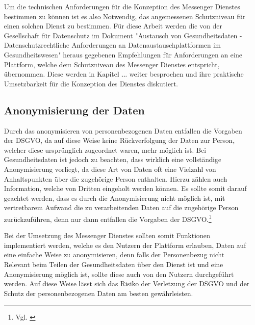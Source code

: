 Um die technischen Anforderungen für die Konzeption des Messenger Dienstes bestimmen zu können ist es also Notwendig, das angemessenen Schutzniveau für einen solchen Dienst zu bestimmen. Für diese Arbeit werden die von der Gesellschaft für Datenschutz im Dokument "Austausch von Gesundheitsdaten -  Datenschutzrechtliche Anforderungen an Datenaustauschplattformen im Gesundheitswesen" heraus gegebenen Empfehlungen für Anforderungen an eine Plattform, welche dem Schutzniveau des Messenger Dienstes entspricht, übernommen. Diese werden in Kapitel ... weiter besprochen und ihre praktische Umsetzbarkeit für die Konzeption des Dienstes diskutiert. 


\subsection{Anonymisierung der Daten}\label{subsection:add}
Durch das anonymisieren von personenbezogenen Daten entfallen die Vorgaben der DSGVO, da auf diese Weise keine Rückverfolgung der Daten zur Person, welcher diese ursprünglich zugeordnet waren, mehr möglich ist. Bei Gesundheitsdaten ist jedoch zu beachten, dass wirklich eine vollständige Anonymisierung vorliegt, da diese Art von Daten oft eine Vielzahl von Anhaltspunkten über die zugehörige Person enthalten. Hierzu zählen auch Information, welche von Dritten eingeholt werden können. Es sollte somit darauf geachtet werden, dass es durch die Anonymisierung nicht möglich ist, mit vertretbarem Aufwand die zu verarbeitenden Daten auf die zugehörige Person zurückzuführen, denn nur dann entfallen die Vorgaben der DSGVO.\footnote{Vgl. \cite[S. 5 f.]{OrientierungshilfezumGesundheitsdatenschutz2018}}

Bei der Umsetzung des Messenger Dienstes sollten somit Funktionen implementiert werden, welche es den Nutzern der Plattform erlauben, Daten auf eine einfache Weise zu anonymisieren, denn falls der Personenbezug nicht Relevant beim Teilen der Gesundheitsdaten über den Dienst ist und eine Anonymisierung möglich ist, sollte diese auch von den Nutzern durchgeführt werden. Auf diese Weise lässt sich das Risiko der Verletzung der DSGVO und der Schutz der personenbezogenen Daten am besten gewährleisten.

